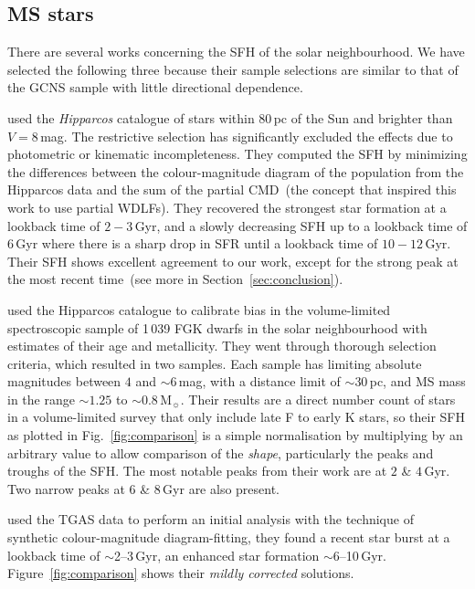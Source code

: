 \documentclass[fleqn,usenatbib]{mnras}
\begin{document}
\subsection{MS stars}
There are several works concerning the SFH of the solar neighbourhood. We
have selected the following three because their sample selections are similar
to that of the GCNS sample with little directional dependence.

\citet{2006A&A...459..783C} used the \textit{Hipparcos} catalogue of stars
within 80\,pc of the Sun and brighter than $V=8$\,mag. The restrictive selection
has significantly excluded the effects due to photometric or kinematic
incompleteness. They computed the SFH by minimizing the differences between the
colour-magnitude diagram of the population from the Hipparcos data and the
sum of the partial CMD~(the concept that inspired this work to use partial
WDLFs). They recovered the strongest star formation at a lookback time of
$2-3$\,Gyr, and a slowly decreasing SFH up to a lookback time of $6$\,Gyr where
there is a sharp drop in SFR until a lookback time of $10-12$\,Gyr. Their SFH
shows excellent agreement to our work, except for the strong peak at the most
recent time~(see more in Section~\ref{sec:conclusion}).

\citet{2007ApJ...665..767R} used the Hipparcos catalogue to calibrate
bias in the \citet{2005ApJS..159..141V} volume-limited spectroscopic
sample of 1\,039 FGK dwarfs in the solar neighbourhood with estimates of
their age and metallicity. They went through thorough selection criteria,
which resulted in two samples. Each sample has limiting absolute magnitudes
between $4$ and $\sim$$6$\,mag, with a distance limit of $\sim$$30$\,pc, and MS mass
in the range $\sim1.25$ to $\sim0.8$\,M$_{\sun}$. Their results are a direct
number count of stars in a volume-limited survey that only include late F to
early K stars, so their SFH as plotted in Fig.~\ref{fig:comparison} is a simple
normalisation by multiplying by an arbitrary value to allow comparison of the
\textit{shape}, particularly the peaks and troughs of the SFH. The most notable
peaks from their work are at $2$ \& $4$\,Gyr. Two narrow peaks at $6$ \&
$8$\,Gyr are also present.

\citet{2018IAUS..330..148B} used the TGAS data to perform an initial
analysis with the technique of synthetic colour-magnitude diagram-fitting, they
found a recent star burst at a lookback time of $\sim$2--3\,Gyr, an enhanced
star formation $\sim$6--10\,Gyr. Figure~\ref{fig:comparison} shows their
\textit{mildly corrected} solutions.
\end{document}
